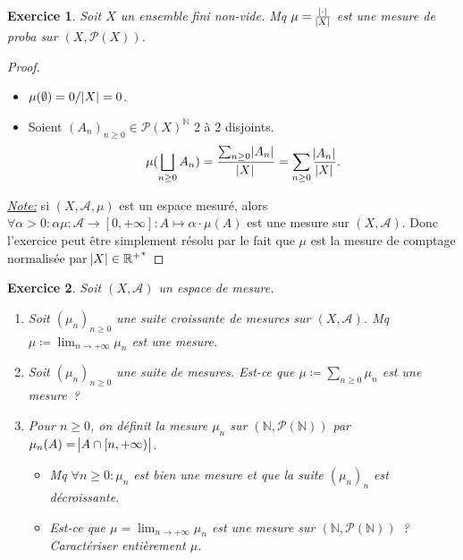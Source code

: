 \documentclass{article}
\newtheorem{ex}{Exercice}[section]
\newcommand{\pinfty}{{+\infty}}
\newcommand{\N}{{\mathbb N}}
\newcommand{\R}{{\mathbb R}}
\begin{document}
\begin{ex} Soit $X$ un ensemble fini non-vide. Mq $\mu = \frac {\abs \cdot}{\abs X}$ est une mesure de proba sur $(X, \mathcal P(X))$.
\end{ex}

\begin{proof}~
\begin{itemize}
	\item $\mu(\emptyset) = 0/\abs X = 0$.
	\item Soient $(A_n)_{n \geq 0} \in \mathcal P(X)^\N$ 2 à 2 disjoints.
	\[\mu(\bigsqcup_{n \geq 0}A_n) = \frac {\sum_{n \geq 0}\abs {A_n}}{\abs X} = \sum_{n \geq 0}\frac {\abs {A_n}}{\abs X}.\]
\end{itemize}

\underline {\textit{Note:}} si $(X, \mathcal A, \mu)$ est un espace mesuré, alors $\forall \alpha > 0 : \alpha\mu : \mathcal A \to [0, \pinfty] : A \mapsto \alpha \cdot \mu(A)$
est une mesure sur $(X, \mathcal A)$. Donc l'exercice peut être simplement résolu par le fait que $\mu$ est la mesure de comptage normalisée par $\abs X \in {\R^+}^*$
\end{proof}

\begin{ex} Soit $(X, \mathcal A)$ un espace de mesure.
\begin{enumerate}
	\item Soit $(\mu_n)_{n \geq 0}$ une suite croissante de mesures sur $(X, \mathcal A)$. Mq $\mu \coloneqq \lim_{n \to \pinfty}\mu_n$ est une mesure.
	\item Soit $(\mu_n)_{n \geq 0}$ une suite de mesures. Est-ce que $\mu \coloneqq \sum_{n \geq 0}\mu_n$ est une mesure~?
	\item Pour $n \geq 0$, on définit la mesure $\mu_n$ sur $(\N, \mathcal P(\N))$ par $\mu_n(A) = \abs {A \cap [n, \pinfty)}$.
	\begin{itemize}
		\item Mq $\forall n \geq 0 : \mu_n$ est bien une mesure et que la suite $(\mu_n)_n$ est décroissante.
		\item Est-ce que $\mu = \lim_{n \to \pinfty}\mu_n$ est une mesure sur $(\N, \mathcal P(\N))$~? Caractériser entièrement $\mu$.
	\end{itemize}
\end{enumerate}
\end{ex}
\end{document}
